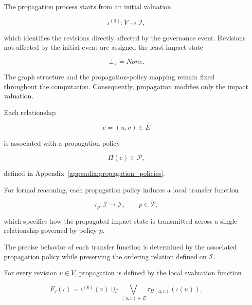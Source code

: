 \documentclass[10pt]{article}
\begin{document}
	The propagation process starts from an initial valuation
	
	\begin{equation}
		\iota^{(0)} : V \rightarrow \mathcal{I},
		\label{eq:initial_impact_valuation}
	\end{equation}
	
	which identifies the revisions directly affected by the governance event.
	Revisions not affected by the initial event are assigned the least impact state
	
	\[
	\bot_{\mathcal I}=None.
	\]
	
	The graph structure and the propagation-policy mapping remain fixed throughout
	the computation. Consequently, propagation modifies only the impact valuation.
	
	
	Each relationship
	
	\[
	e=(u,v)\in E
	\]
	
	is associated with a propagation policy
	
	\[
	\Pi(e)\in\mathcal P,
	\]
	
	defined in Appendix~\ref{appendix:propagation_policies}.
	
	For formal reasoning, each propagation policy induces a local transfer function
	
	\begin{equation}
		\tau_p :
		\mathcal I
		\rightarrow
		\mathcal I,
		\qquad
		p\in\mathcal P,
		\label{eq:transfer_function}
	\end{equation}
	
	which specifies how the propagated impact state is transmitted across a single
	relationship governed by policy $p$.
	
	The precise behavior of each transfer function is determined by the associated
	propagation policy while preserving the ordering relation defined on
	$\mathcal I$.
	
	
	For every revision $v\in V$, propagation is defined by the local evaluation
	function
	
	\begin{equation}
		\label{eq:local_transfer}
		F_v(\iota)
		=
		\iota^{(0)}(v)
		\sqcup_{\mathcal I}
		\bigvee_{(u,v)\in E}
		\tau_{\Pi(u,v)}
		\!\left(
		\iota(u)
		\right),
	\end{equation}
	
\end{document}
